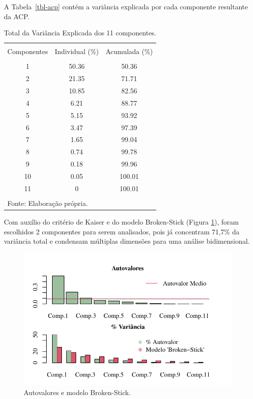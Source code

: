 \documentclass[a4paper,12pt]{article}
\begin{document}
A Tabela~\ref{tbl-acp} contém a variância explicada por cada componente
resultante da ACP.

\hypertarget{tbl-acp}{}
\begin{table}[!htbp] \centering 
  \caption{\label{tbl-acp}Total da Variância Explicada dos 11 componentes. } 
  \label{} 
\begin{tabular}{@{\extracolsep{5pt}} ccc} 
\\[-1.8ex]\hline 
\hline \\[-1.8ex] 
Componentes & Individual (\%) & Acumulada (\%) \\ 
\hline \\[-1.8ex] 
1 & 50.36 & 50.36 \\ 
2 & 21.35 & 71.71 \\ 
3 & 10.85 & 82.56 \\ 
4 & 6.21 & 88.77 \\ 
5 & 5.15 & 93.92 \\ 
6 & 3.47 & 97.39 \\ 
7 & 1.65 & 99.04 \\ 
8 & 0.74 & 99.78 \\ 
9 & 0.18 & 99.96 \\ 
10 & 0.05 & 100.01 \\ 
11 & 0 & 100.01 \\ 
\hline \\[-1.8ex] 
\multicolumn{3}{l}{Fonte: Elaboração própria.} \\ 
\end{tabular} 
\end{table}

\newpage

Com auxílio do critério de Kaiser e do modelo Broken-Stick (Figura
\ref{fig-acp}), foram escolhidos 2 componentes para serem analisados,
pois já concentram 71,7\% da variância total e condensam múltiplas
dimensões para uma análise bidimensional.

\begin{figure}

\caption{\label{fig-acp}Autovalores e modelo Broken-Stick.}

{\centering \includegraphics{main_files/figure-pdf/fig-acp-1.pdf}

}

\end{figure}
\end{document}

